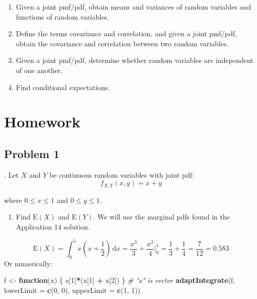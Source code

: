 \documentclass[
]{book}
\newenvironment{Shaded}{\begin{snugshade}}{\end{snugshade}}
\newcommand{\CommentTok}[1]{\textcolor[rgb]{0.56,0.35,0.01}{\textit{#1}}}
\newcommand{\ControlFlowTok}[1]{\textcolor[rgb]{0.13,0.29,0.53}{\textbf{#1}}}
\newcommand{\DataTypeTok}[1]{\textcolor[rgb]{0.13,0.29,0.53}{#1}}
\newcommand{\DecValTok}[1]{\textcolor[rgb]{0.00,0.00,0.81}{#1}}
\newcommand{\KeywordTok}[1]{\textcolor[rgb]{0.13,0.29,0.53}{\textbf{#1}}}
\newcommand{\NormalTok}[1]{#1}
\newcommand{\OperatorTok}[1]{\textcolor[rgb]{0.81,0.36,0.00}{\textbf{#1}}}
\newcommand{\StringTok}[1]{\textcolor[rgb]{0.31,0.60,0.02}{#1}}
\providecommand{\tightlist}{%
  \setlength{\itemsep}{0pt}\setlength{\parskip}{0pt}}
\begin{document}
\begin{enumerate}
\def\labelenumi{\arabic{enumi})}
\tightlist
\item
  Given a joint pmf/pdf, obtain means and variances of random variables and functions of random variables.\\
\item
  Define the terms covariance and correlation, and given a joint pmf/pdf, obtain the covariance and correlation between two random variables.\\
\item
  Given a joint pmf/pdf, determine whether random variables are independent of one another.\\
\item
  Find conditional expectations.
\end{enumerate}

\hypertarget{homework-14}{%
\section{Homework}\label{homework-14}}

\hypertarget{problem-1-14}{%
\subsection{Problem 1}\label{problem-1-14}}

. Let \(X\) and \(Y\) be continuous random variables with joint pdf:
\[
f_{X,Y}(x,y)=x + y
\]

where \(0 \leq x \leq 1\) and \(0 \leq y \leq 1\).

\begin{enumerate}
\def\labelenumi{\alph{enumi}.}
\tightlist
\item
  Find \(\mbox{E}(X)\) and \(\mbox{E}(Y)\). We will use the marginal pdfs found in the Application 14 solution.
\end{enumerate}

\[
\mbox{E}(X)=\int_0^1 x\left(x+\frac{1}{2}\right)\,\mathrm{d}x=\frac{x^3}{3}+\frac{x^2}{4}\bigg|_0^1=\frac{1}{3}+\frac{1}{4}=\frac{7}{12}=0.583
\]
Or numerically:

\begin{Shaded}
\begin{Highlighting}[]
\NormalTok{f <-}\StringTok{ }\ControlFlowTok{function}\NormalTok{(x) \{ x[}\DecValTok{1}\NormalTok{]}\OperatorTok{*}\NormalTok{(x[}\DecValTok{1}\NormalTok{] }\OperatorTok{+}\StringTok{ }\NormalTok{x[}\DecValTok{2}\NormalTok{]) \} }\CommentTok{# "x" is vector}
\KeywordTok{adaptIntegrate}\NormalTok{(f, }\DataTypeTok{lowerLimit =} \KeywordTok{c}\NormalTok{(}\DecValTok{0}\NormalTok{, }\DecValTok{0}\NormalTok{), }\DataTypeTok{upperLimit =} \KeywordTok{c}\NormalTok{(}\DecValTok{1}\NormalTok{, }\DecValTok{1}\NormalTok{))}
\end{Highlighting}
\end{Shaded}
\end{document}

